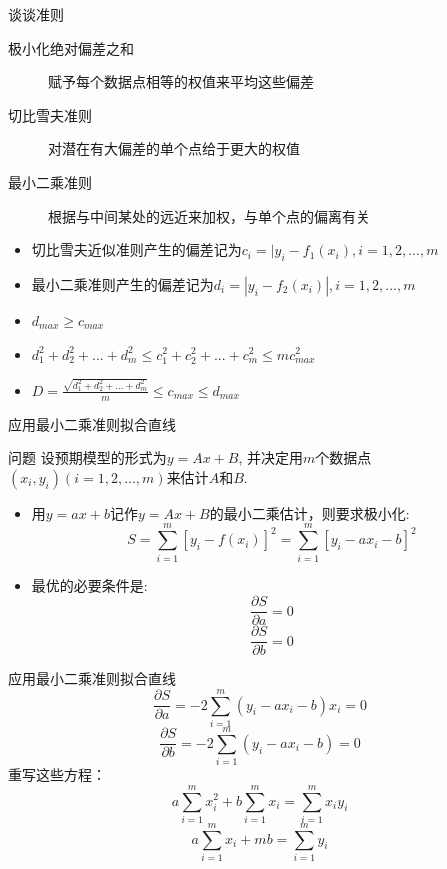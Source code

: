 \documentclass[mathserif]{beamer}
\begin{document}
\begin{frame}{谈谈准则}
  \begin{description}
  \item[极小化绝对偏差之和] 赋予每个数据点相等的权值来平均这些偏差
  \item[切比雪夫准则] 对潜在有大偏差的单个点给于更大的权值
  \item[最小二乘准则] 根据与中间某处的远近来加权，与单个点的偏离有关
  \end{description}

  \begin{itemize}
  \item 切比雪夫近似准则产生的偏差记为$c_i = |y_i - f_1(x_i), i=1,2,...,m$
  \item 最小二乘准则产生的偏差记为$d_i = |y_i - f_2(x_i)|, i=1,2,...,m$
  \item $d_{max} \ge c_{max}$
  \item $d_1^2+d_2^2+...+d_m^2 \le c_1^2+c_2^2+...+c_m^2 \le mc_{max}^2$
  \item $D=\frac{\sqrt{d_1^2+d_2^2+...+d_m^2}}{m} \le c_{max} \le d_{max}$
  \end{itemize}

\end{frame}

\begin{frame}{应用最小二乘准则拟合直线}
  \begin{block}{问题}
    设预期模型的形式为$y=Ax+B$, 并决定用$m$个数据点$(x_i, y_i)(i=1,2,...,m)$来估计$A$和$B$.
  \end{block}
  
  \begin{itemize}
  \item 用$y=ax+b$记作$y=Ax+B$的最小二乘估计，则要求极小化:
    \[
    S=\sum_{i=1}^m[y_i-f(x_i)]^2=\sum_{i=1}^m[y_i-ax_i-b]^2
    \]
  \item 最优的必要条件是:
    \[
    \frac{\partial S}{\partial a} = 0
    \]
    \[
    \frac{\partial S}{\partial b} = 0
    \]
  \end{itemize}
\end{frame}

\begin{frame}{应用最小二乘准则拟合直线}
  \[
  \frac{\partial S}{\partial a} = -2\sum_{i=1}^m(y_i-ax_i-b)x_i = 0
  \]
  \[
  \frac{\partial S}{\partial b} = -2\sum_{i=1}^m(y_i-ax_i-b) = 0
  \]
  重写这些方程：
  \[
  a\sum_{i=1}^mx_i^2 + b\sum_{i=1}^mx_i = \sum_{i=1}^mx_iy_i
  \]
  \[
  a\sum_{i=1}^mx_i + mb = \sum_{i=1}^my_i
  \]
\end{frame}
\end{document}
